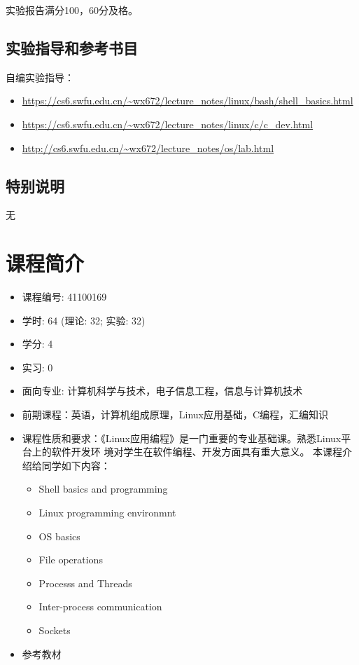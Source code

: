 \documentclass{wx672ctexart}
\begin{document}
实验报告满分100，60分及格。

\subsection{实验指导和参考书目}
\label{sec-3-7}

自编实验指导：
\begin{itemize}
\item
  \url{https://cs6.swfu.edu.cn/~wx672/lecture_notes/linux/bash/shell_basics.html}
\item \url{https://cs6.swfu.edu.cn/~wx672/lecture_notes/linux/c/c_dev.html}
\item \url{http://cs6.swfu.edu.cn/~wx672/lecture_notes/os/lab.html}
\end{itemize}

\subsection{特别说明}
\label{sec-3-8}

无

\section{课程简介}
\label{sec-4}

\begin{itemize}
\item 课程编号: 41100169
\item 学时: 64 (理论: 32; 实验: 32)
\item 学分: 4
\item 实习: 0
\item 面向专业: 计算机科学与技术，电子信息工程，信息与计算机技术
\item 前期课程：英语，计算机组成原理，Linux应用基础，C编程，汇编知识
\item 课程性质和要求：《Linux应用编程》是一门重要的专业基础课。熟悉Linux平台上的软件开发环
  境对学生在软件编程、开发方面具有重大意义。 本课程介绍给同学如下内容：
  \begin{itemize}
  \item Shell basics and programming
  \item Linux programming environmnt
  \item OS basics
  \item File operations
  \item Processs and Threads
  \item Inter-process communication
  \item Sockets
  \end{itemize}
\item 参考教材\hfill
  \nocite{cs241, matthew2008beginning, cooper10bash, raymond2003art, stevens2013advanced,
    love:2007:lsp:1205435, kerrisk:2010:lpi:1869911, bryant2010computersystems,
    silberschatz11essentials, tanenbaum2008modern, bovet2005understanding}
  \printbibliography[heading=none]{}
\end{itemize}
\end{document}
